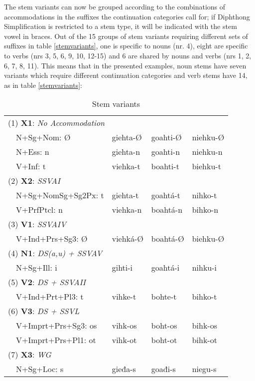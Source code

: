 \documentclass[a4paper,english]{article}
\begin{document}
The stem variants can now be grouped according to the combinations of accommodations in the suffixes the continuation categories call for; if Diphthong Simplification is restricted to a stem type, it will be indicated with the stem vowel in braces. Out of the 15 groups of stem variants requiring different sets of suffixes in  table \ref{stemvariants}, one is specific to nouns (nr. 4), eight are specific to verbs (nrs 3, 5, 6, 9, 10, 12-15) and 6 are shared by nouns and verbs (nrs 1, 2, 6, 7, 8, 11). This means that in the presented examples, noun stems have seven variants which require different continuation categories and verb stems have 14, as in table \ref{stemvariants}:

\begin{table}[htdp]
\caption{Stem variants}
\begin{center}
\begin{tabular}{lllll}
\multicolumn{4}{l}{(1) \textbf{X1}: \textit{No Accommodation}}\\ 
  & N+Sg+Nom: Ø & giehta-Ø & goahti-Ø & niehku-Ø\\ 
  & N+Ess: n & giehta-n & goahti-n & niehku-n\\ 
  & V+Inf: t & viehka-t & boahti-t & biehku-t\\ 
\multicolumn{4}{l}{(2) \textbf{X2}: \textit{SSVAI}}\\ 
  & N+Sg+NomSg+Sg2Px: t & giehta-t & goahtá-t & nihko-t\\ 
  & V+PrfPtcl: n & viehka-n & boahtá-n & bihko-n\\ 
\multicolumn{4}{l}{(3) \textbf{V1}: \textit{SSVAIV}}\\ 
  & V+Ind+Prs+Sg3: Ø & viehká-Ø & boahtá-Ø & biehku-Ø\\ 
\multicolumn{4}{l}{(4) \textbf{N1}: \textit{DS(a,u) + SSVAV}}\\ 
  & N+Sg+Ill: i & gihti-i & goahtá-i & nihku-i\\ 
\multicolumn{4}{l}{(5) \textbf{V2}: \textit{DS + SSVAII}}\\ 
  & V+Ind+Prt+Pl3: t & vihke-t & bohte-t & bihko-t\\ 
\multicolumn{4}{l}{(6) \textbf{V3}: \textit{DS + SSVL}}\\ 
  & V+Imprt+Prs+Sg3: os & vihk-os & boht-os & bihk-os\\ 
  & V+Imprt+Prs+Pl1: ot & vihk-ot & boht-ot & bihk-ot\\ 
\multicolumn{4}{l}{(7) \textbf{X3}: \textit{WG}}\\ 
  & N+Sg+Loc: s & gieđa-s & goađi-s & niegu-s\\ 

\end{tabular}
\end{center}
\end{table}
\end{document}
